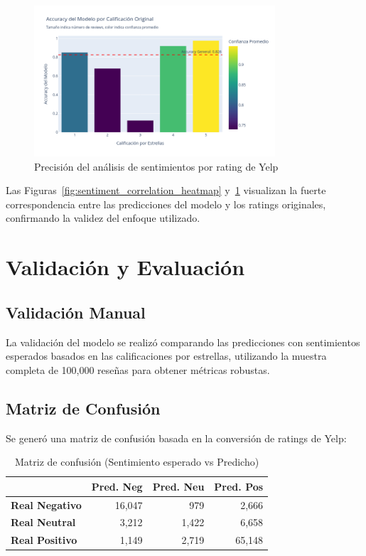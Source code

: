 \documentclass[12pt,a4paper,twoside,openany]{book}
\begin{document}
\begin{figure}[H]
\centering
\includegraphics[width=0.8\textwidth]{figures/sentiment_accuracy_by_rating.png}
\caption{Precisión del análisis de sentimientos por rating de Yelp}
\label{fig:sentiment_accuracy_by_rating}
\end{figure}

Las Figuras~\ref{fig:sentiment_correlation_heatmap} y~\ref{fig:sentiment_accuracy_by_rating} visualizan la fuerte correspondencia entre las predicciones del modelo y los ratings originales, confirmando la validez del enfoque utilizado.

\section{Validación y Evaluación}

\subsection{Validación Manual}

La validación del modelo se realizó comparando las predicciones con sentimientos esperados basados en las calificaciones por estrellas, utilizando la muestra completa de 100,000 reseñas para obtener métricas robustas.

\subsection{Matriz de Confusión}

Se generó una matriz de confusión basada en la conversión de ratings de Yelp:

\begin{table}[H]
\centering
\caption{Matriz de confusión (Sentimiento esperado vs Predicho)}
\begin{tabular}{@{}lrrr@{}}
\toprule
\textbf{} & \textbf{Pred. Neg} & \textbf{Pred. Neu} & \textbf{Pred. Pos} \\
\midrule
\textbf{Real Negativo} & 16,047 & 979 & 2,666 \\
\textbf{Real Neutral} & 3,212 & 1,422 & 6,658 \\
\textbf{Real Positivo} & 1,149 & 2,719 & 65,148 \\
\bottomrule
\end{tabular}
\end{table}
\end{document}
